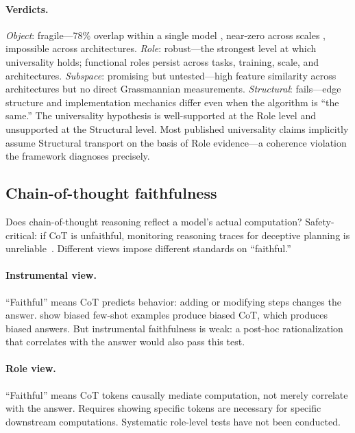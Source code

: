 \documentclass{article}
\begin{document}
\paragraph{Verdicts.}
\emph{Object}: fragile---78\% overlap within a single model
\citep{merullo2024}, near-zero across scales \citep{tigges2024},
impossible across architectures.
\emph{Role}: robust---the strongest level at which universality holds;
functional roles persist across tasks, training, scale, and
architectures.
\emph{Subspace}: promising but untested---high feature similarity across
architectures \citep{wang2024universality} but no direct Grassmannian
measurements.
\emph{Structural}: fails---edge structure and implementation mechanics
differ even when the algorithm is ``the same.''
The universality hypothesis is well-supported at the Role level and
unsupported at the Structural level. Most published universality claims
implicitly assume Structural transport on the basis of Role evidence---a
coherence violation the framework diagnoses precisely.


\subsection{Chain-of-thought faithfulness}\label{app:cs_cot}

Does chain-of-thought reasoning reflect a model's actual computation?
Safety-critical: if CoT is unfaithful, monitoring reasoning traces for
deceptive planning is unreliable~\citep{lanham2023measuring}. Different
views impose different standards on ``faithful.''

\paragraph{Instrumental view.}
``Faithful'' means CoT predicts behavior: adding or modifying steps
changes the answer. \citet{turpin2023} show biased few-shot examples
produce biased CoT, which produces biased answers. But instrumental
faithfulness is weak: a post-hoc rationalization that correlates with the
answer would also pass this test.

\paragraph{Role view.}
``Faithful'' means CoT tokens causally mediate computation, not merely
correlate with the answer. Requires showing specific tokens are necessary
for specific downstream computations. Systematic role-level tests have
not been conducted.
\end{document}
